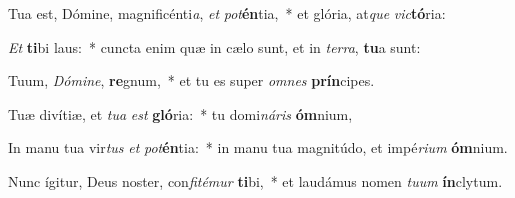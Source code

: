 \item Tua est, Dómine, magnificénti\textit{a}, \textit{et} \textit{pot}\textbf{én}tia,~* et glória, at\textit{que} \textit{vic}\textbf{tó}ria:
\item \textit{Et} \textbf{ti}bi laus:~* cuncta enim quæ in cælo sunt, et in \textit{ter}\textit{ra}, \textbf{tu}a sunt:
\item Tuum, \textit{Dó}\textit{mi}\textit{ne}, \textbf{re}gnum,~* et tu es super \textit{om}\textit{nes} \textbf{prín}cipes.
\item Tuæ divítiæ, et \textit{tu}\textit{a} \textit{est} \textbf{gló}ria:~* tu domi\textit{ná}\textit{ris} \textbf{óm}nium,
\item In manu tua vir\textit{tus} \textit{et} \textit{pot}\textbf{én}tia:~* in manu tua magnitúdo, et impé\textit{ri}\textit{um} \textbf{óm}nium.
\item Nunc ígitur, Deus noster, con\textit{fi}\textit{té}\textit{mur} \textbf{ti}bi,~* et laudámus nomen \textit{tu}\textit{um} \textbf{ín}clytum.
